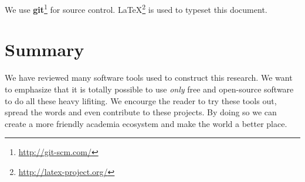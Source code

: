 We use \textbf{git}\footnote{\url{http://git-scm.com/}} for source control. \LaTeX\footnote{\url{http://latex-project.org/}} is used to typeset this document.

\section*{Summary}
We have reviewed many software tools used to construct this research. We want to emphasize that it is totally possible to use \textit{only} free and open-source software to do all these heavy lifiting. We encourge the reader to try these tools out, spread the words and even contribute to these projects. By doing so we can create a more friendly academia ecosystem and make the world a better place.
